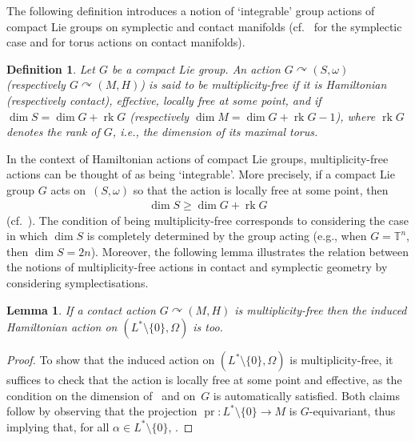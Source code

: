 \documentclass[10pt,a4paper]{amsart}
\numberwithin{equation}{section}
\newtheorem{Lemma}[Theorem]{Lemma}
\newtheorem{Definition}[Theorem]{Definition}
\newcommand{\CM}{(M,H)} %
\newcommand{\SM}{(S,\omega)} %
\newcommand{\SYM}{L^* \setminus \{0\}} %
\begin{document}
The following def\/inition introduces a notion of `integrable' group actions of compact Lie groups on symplectic and contact manifolds (cf.\ \cite[Def\/inition 5.1.11]{gui_sja} for the symplectic case and \cite[Def\/inition~2.11]{lerman_contact_toric} for torus actions on contact manifolds).

\begin{Definition}\label{defn:mult_free}
Let $G$ be a compact Lie group. An action $G \curvearrowright \SM$ (respectively $G \curvearrowright \CM$) is said to be {\it multiplicity-free} if it is Hamiltonian (respectively contact), ef\/fective, locally free at some point, and if $\dim S = \dim G + \operatorname{rk} G$ (respectively $ \dim M = \dim G + \operatorname{rk} G - 1$), where $\operatorname{rk} G$ denotes the rank of $G$, i.e., the dimension of its maximal torus.
\end{Definition}

In the context of Hamiltonian actions of compact Lie groups, multiplicity-free actions can be thought of as being `integrable'. More precisely, if a compact Lie group $G$ acts on~$\SM$ so that the action is locally free at some point, then
\begin{gather*}
 \dim S \geq \dim G + \operatorname{rk} G
\end{gather*}
(cf.\ \cite[Theorem~5.1.6]{gui_sja}). The condition of being multiplicity-free corresponds to considering the case in which $\dim S$ is completely determined by the group acting (e.g., when $G = \mathbb{T}^n$, then $\dim S = 2n$). Moreover, the following lemma illustrates the relation between the notions of multiplicity-free actions in contact and symplectic geometry by considering symplectisations.

\begin{Lemma}\label{prop:lift}
If a contact action $G \curvearrowright \CM$ is multiplicity-free then the induced Hamiltonian action on $(\SYM,\Omega)$ is too.
\end{Lemma}

\begin{proof} To show that the induced action on $(\SYM,\Omega)$ is multiplicity-free, it suf\/f\/ices to check that the action is locally free at some point and ef\/fective, as the condition on the dimension of~\smash{$\SYM$} and on~$G$ is automatically satisf\/ied. Both claims follow by observing that the projection $\operatorname{pr} \colon \SYM \to M$ is $G$-equivariant, thus implying that, for all $\alpha \in \SYM$, .
\end{proof}
\end{document}
